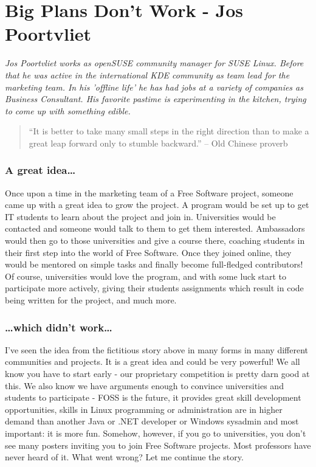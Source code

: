 \chapter{Big Plans Don't Work - Jos Poortvliet}

\textit{Jos Poortvliet works as openSUSE community manager for SUSE Linux. Before that he was active in the international KDE community as team lead for the marketing team. In his 'offline life' he has had jobs at a variety of companies as Business Consultant. His favorite pastime is experimenting in the kitchen, trying to come up with something edible.}

\begin{quote}``It is better to take many small steps in the right direction than to make a great leap forward only to stumble backward.'' -- Old Chinese proverb\end{quote}

\subsection*{A great idea\dots}
Once upon a time in the marketing team of a Free Software project, someone came up with a great idea to grow the project. A program would be set up to get IT students to learn about the project and join in. Universities would be contacted and someone would talk to them to get them interested. Ambassadors would then go to those universities and give a course there, coaching students in their first step into the world of Free Software. Once they joined online, they would be mentored on simple tasks and finally become full-fledged contributors! Of course, universities would love the program, and with some luck start to participate more actively, giving their students assignments which result in code being written for the project, and much more.

\subsection*{\dots which didn't work\dots}
I've seen the idea from the fictitious story above in many forms in many different communities and projects. It is a great idea and could be very powerful! We all know you have to start early - our proprietary competition is pretty darn good at this. We also know we have arguments enough to convince universities and students to participate - FOSS is the future, it provides great skill development opportunities, skills in Linux programming or administration are in higher demand than another Java or .NET developer or Windows sysadmin and most important: it is more fun. Somehow, however, if you go to universities, you don't see many posters inviting you to join Free Software projects. Most professors have never heard of it. What went wrong? Let me continue the story.

